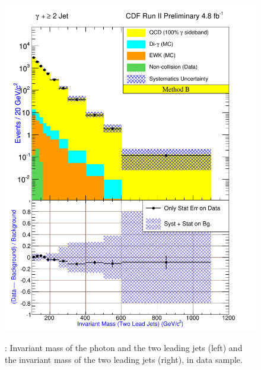 \documentclass[11pt]{article}
\begin{document}
\begin{figure}[h!]
{ \includegraphics[scale=\resultsHistScale,keepaspectratio=true]{./g30jet_MtdB_plot2_InvMass_j1j2.pdf}
}
\caption{: Invariant mass of the photon and the two leading jets (left) and the invariant mass of the two leading jets (right), in \photwojet data sample.}
\label{fig:Result_MtdB_gj2_Mass_gj1j2}
\end{figure}

\clearpage
\newpage

\end{document}
